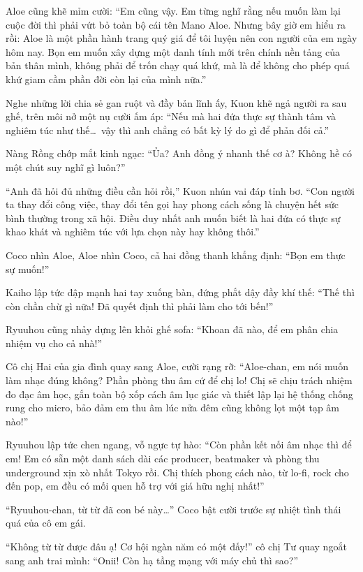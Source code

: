﻿\documentclass[../main.tex]{subfiles}
\begin{document}
Aloe cũng khẽ mỉm cười: ``Em cũng vậy. Em từng nghĩ rằng nếu muốn làm lại cuộc đời thì phải vứt bỏ toàn bộ cái tên Mano Aloe. Nhưng bây giờ em hiểu ra rồi: Aloe là một phần hành trang quý giá để tôi luyện nên con người của em ngày hôm nay. Bọn em muốn xây dựng một danh tính mới trên chính nền tảng của bản thân mình, không phải để trốn chạy quá khứ, mà là để không cho phép quá khứ giam cầm phần đời còn lại của mình nữa.''

Nghe những lời chia sẻ gan ruột và đầy bản lĩnh ấy, Kuon khẽ ngả người ra sau ghế, trên môi nở một nụ cười ấm áp: ``Nếu mà hai đứa thực sự thành tâm và nghiêm túc như thế\dots\ vậy thì anh chẳng có bất kỳ lý do gì để phản đối cả.''

Nàng Rồng chớp mắt kinh ngạc: ``Ủa? Anh đồng ý nhanh thế cơ à? Không hề có một chút suy nghĩ gì luôn?''

``Anh đã hỏi đủ những điều cần hỏi rồi,'' Kuon nhún vai đáp tỉnh bơ. ``Con người ta thay đổi công việc, thay đổi tên gọi hay phong cách sống là chuyện hết sức bình thường trong xã hội. Điều duy nhất anh muốn biết là hai đứa có thực sự khao khát và nghiêm túc với lựa chọn này hay không thôi.''

Coco nhìn Aloe, Aloe nhìn Coco, cả hai đồng thanh khẳng định: ``Bọn em thực sự muốn!''

Kaiho lập tức đập mạnh hai tay xuống bàn, đứng phắt dậy đầy khí thế: ``Thế thì còn chần chừ gì nữa! Đã quyết định thì phải làm cho tới bến!''

Ryuuhou cũng nhảy dựng lên khỏi ghế sofa: ``Khoan đã nào, để em phân chia nhiệm vụ cho cả nhà!''

Cô chị Hai của gia đình quay sang Aloe, cười rạng rỡ: ``Aloe-chan, em nói muốn làm nhạc đúng không? Phần phòng thu âm cứ để chị lo! Chị sẽ chịu trách nhiệm đo đạc âm học, gắn toàn bộ xốp cách âm lục giác và thiết lập lại hệ thống chống rung cho micro, bảo đảm em thu âm lúc nửa đêm cũng không lọt một tạp âm nào!''

Ryuuhou lập tức chen ngang, vỗ ngực tự hào: ``Còn phần kết nối âm nhạc thì để em! Em có sẵn một danh sách dài các producer, beatmaker và phòng thu underground xịn xò nhất Tokyo rồi. Chị thích phong cách nào, từ lo-fi, rock cho đến pop, em đều có mối quen hỗ trợ với giá hữu nghị nhất!''

``Ryuuhou-chan, từ từ đã con bé này\dots'' Coco bật cười trước sự nhiệt tình thái quá của cô em gái.

``Không từ từ được đâu ạ! Cơ hội ngàn năm có một đấy!'' cô chị Tư quay ngoắt sang anh trai mình: ``Onii! Còn hạ tầng mạng với máy chủ thì sao?''
\end{document}
